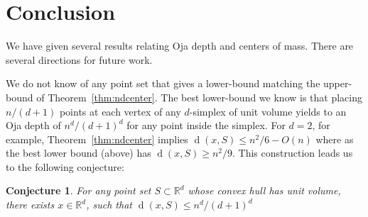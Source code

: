 \documentclass[preprint, 12pt]{elsarticle}
\newtheorem{conj}{Conjecture}
\DeclareMathOperator{\od}{d}
\newcommand{\R}{\mathbb{R}}
\begin{document}
\section{Conclusion}
\label{sec:concl}

We have given several results relating Oja depth and centers of mass.
There are several directions for future work.

We do not know of any point set that gives a lower-bound matching the
upper-bound of Theorem~\ref{thm:ndcenter}. The best lower-bound we know
is that placing $n/(d+1)$ points at each vertex of any $d$-simplex of
unit volume yields to an Oja depth of $n^d / (d+1)^{d}$ for any point
inside the simplex.  For $d=2$, for example, Theorem~\ref{thm:ndcenter}
implies $\od(x, S)\le n^2/6 - O(n)$ where as the best lower bound (above)
has $\od(x, S)\ge n^2/9$.  This construction leads us to the following
conjecture:
\begin{conj}
For any point set $S\subset\R^d$ whose convex hull has unit volume, there exists $x\in\R^d$, such that $\od(x,S)\le n^d / (d+1)^{d}$
\end{conj}




\end{document}
